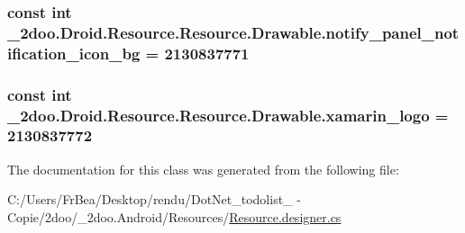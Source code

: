 \hypertarget{class__2doo_1_1_droid_1_1_resource_1_1_drawable_8b25dacaa1f962be2ef7cf42319c06be}{
\subsubsection[{notify\_\-panel\_\-notification\_\-icon\_\-bg}]{\setlength{\rightskip}{0pt plus 5cm}const int \_\-2doo.Droid.Resource.Resource.Drawable.notify\_\-panel\_\-notification\_\-icon\_\-bg = 2130837771}}
\label{class__2doo_1_1_droid_1_1_resource_1_1_drawable_8b25dacaa1f962be2ef7cf42319c06be}


\hypertarget{class__2doo_1_1_droid_1_1_resource_1_1_drawable_25cfff810eae205cf1dc24a6323c0486}{
\subsubsection[{xamarin\_\-logo}]{\setlength{\rightskip}{0pt plus 5cm}const int \_\-2doo.Droid.Resource.Resource.Drawable.xamarin\_\-logo = 2130837772}}
\label{class__2doo_1_1_droid_1_1_resource_1_1_drawable_25cfff810eae205cf1dc24a6323c0486}




The documentation for this class was generated from the following file:\begin{CompactItemize}
\item 
C:/Users/FrBea/Desktop/rendu/DotNet\_\-todolist\_ - Copie/2doo/\_\-2doo.Android/Resources/\hyperlink{_resource_8designer_8cs}{Resource.designer.cs}\end{CompactItemize}
